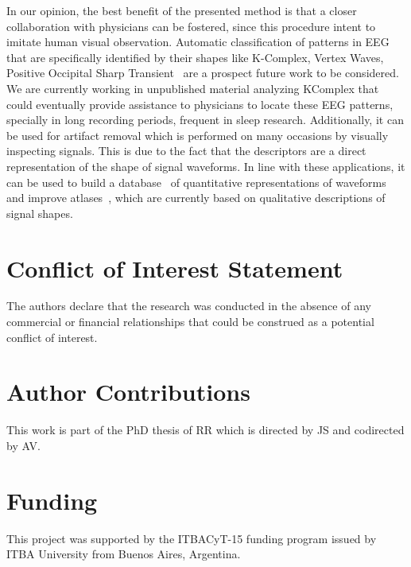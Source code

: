 \documentclass[utf8]{frontiersSCNS} %
\begin{document}
In our opinion, the best benefit of the presented method is that a closer collaboration with physicians can be fostered, since this procedure intent to imitate human visual observation.  Automatic classification of patterns in EEG that are specifically identified by their shapes like K-Complex, Vertex Waves, Positive Occipital Sharp Transient~\citep{Hartman2005} are a prospect future work to be considered. We are currently working in unpublished material analyzing KComplex that could eventually provide  assistance to physicians to locate these EEG patterns, specially in long recording periods, frequent in sleep research.  
Additionally, it can be used for artifact removal which is performed on many occasions by visually inspecting signals.  This is due to the fact that the descriptors are a direct representation of the shape of signal waveforms. In line with these applications,  it can be used to build a database~\citep{Chavarriaga2017} of quantitative representations of waveforms and improve atlases~\citep{Hartman2005}, which are currently based on qualitative descriptions of signal shapes.

\section*{Conflict of Interest Statement}
The authors declare that the research was conducted in the absence of any commercial or financial relationships that could be construed as a potential conflict of interest.

\section*{Author Contributions}

This work is part of the PhD thesis of RR which is directed by JS and codirected by AV.   

\section*{Funding}
This project was supported by the ITBACyT-15 funding program issued by ITBA University from Buenos Aires, Argentina.


\end{document}
